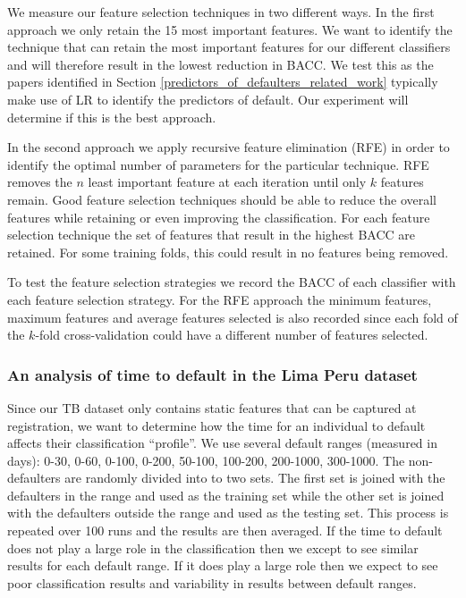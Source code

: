 \documentclass{sig-alternate-05-2015}
\begin{document}
	We measure our feature selection techniques in two different ways. In the first approach we only retain the 15 most important features. We want to identify the technique that can retain the most important features for our different classifiers and will therefore result in the lowest reduction in BACC. We test this as the papers identified in Section \ref{predictors_of_defaulters_related_work} typically make use of LR to identify the predictors of default. Our experiment will determine if this is the best approach.
	
	In the second approach we apply recursive feature elimination (RFE) in order to identify the optimal number of parameters for the particular technique. RFE removes the $n$ least important feature at each iteration until only $k$ features remain. Good feature selection techniques should be able to reduce the overall features while retaining or even improving the classification. For each feature selection technique the set of features that result in the highest BACC are retained. For some training folds, this could result in no features being removed. 
	
	To test the feature selection strategies we record the BACC of each classifier with each feature selection strategy. For the RFE approach the minimum features, maximum features and average features selected is also recorded since each fold of the $k$-fold cross-validation could have a different number of features selected.
	
	\subsubsection{An analysis of time to default in the Lima Peru dataset}
	Since our TB dataset only contains static features that can be captured at registration, we want to determine how the time for an individual to default affects their classification ``profile''. We use several default ranges (measured in days): 0-30, 0-60, 0-100, 0-200, 50-100, 100-200, 200-1000, 300-1000. The non-defaulters are randomly divided into to two sets. The first set is joined with the defaulters in the range and used as the training set while the other set is joined with the defaulters outside the range and used as the testing set. This process is repeated over 100 runs and the results are then averaged. If the time to default does not play a large role in the classification then we except to see similar results for each default range. If it does play a large role then we expect to see poor classification results and variability in results between default ranges.
	
\end{document}
